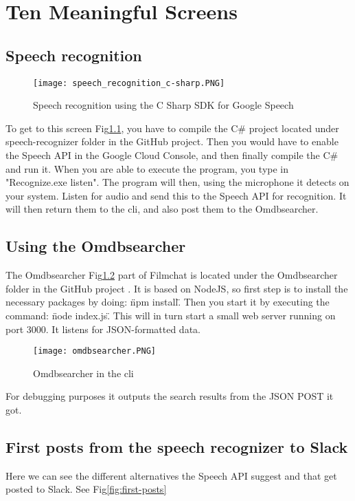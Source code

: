 \documentclass[11pt,fleqn]{book} %
\begin{document}
\chapter{Ten Meaningful Screens}
\section{Speech recognition}
\begin{figure}[]
  \centering
   \texttt{[image: speech\_recognition\_c-sharp.PNG]}
  \caption{Speech recognition using the C Sharp SDK for Google Speech}
  \label{fig:c-sharp-speech}
\end{figure}
To get to this screen Fig\ref{fig:c-sharp-speech}, you have to compile the C\# project located under speech-recognizer folder in the GitHub project. \cite{Github2017GitHubProject}
Then you would have to enable the Speech API in the Google Cloud Console, and then finally compile the C\# and run it.
When you are able to execute the program, you type in "Recognize.exe listen". The program will then, using the microphone it detects on your system. Listen for audio and send this to the Speech API for recognition. It will then return them to the cli, and also post them to the Omdbsearcher.

\newpage
\section{Using the Omdbsearcher}
The Omdbsearcher Fig\ref{fig:omdbsearcher} part of Filmchat is located under the Omdbsearcher folder in the GitHub project \cite{Github2017GitHubProject}. It is based on NodeJS, so first step is to install the necessary packages by doing: \"npm install\". Then you start it by executing the command: \"node index.js\". This will in turn start a small web server running on port 3000.
It listens for JSON-formatted data.
\begin{figure}[]
  \centering
   \texttt{[image: omdbsearcher.PNG]}
  \caption{Omdbsearcher in the cli}
  \label{fig:omdbsearcher}
\end{figure}
For debugging purposes it outputs the search results from the JSON POST it got.

\newpage
\section{First posts from the speech recognizer to Slack}
Here we can see the different alternatives the Speech API suggest and that get posted to Slack. See Fig\ref{fig:first-posts}
\end{document}
